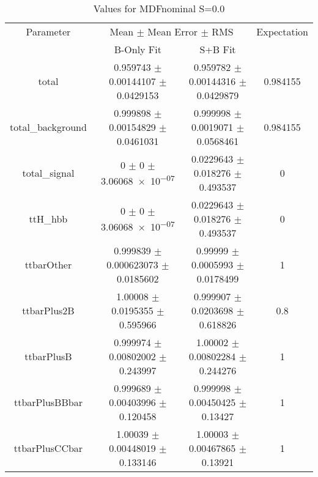 \begin{table}
\centering
\caption{Values for MDFnominal S=0.0}
\begin{tabular}{cccc}
\toprule
Parameter & \multicolumn{2}{c}{Mean $\pm$ Mean Error $\pm$ RMS} & Expectation\\
 & B-Only Fit & S+B Fit & \\
\midrule
total & \num{0.959743} $\pm$ \num{0.00144107} $\pm$ \num{0.0429153} & \num{0.959782} $\pm$ \num{0.00144316} $\pm$ \num{0.0429879} & \num{0.984155}\\
total\_background & \num{0.999898} $\pm$ \num{0.00154829} $\pm$ \num{0.0461031} & \num{0.999998} $\pm$ \num{0.0019071} $\pm$ \num{0.0568461} & \num{0.984155}\\
total\_signal & \num{0} $\pm$ \num{0} $\pm$ \num{3.06068e-07} & \num{0.0229643} $\pm$ \num{0.018276} $\pm$ \num{0.493537} & \num{0}\\
ttH\_hbb & \num{0} $\pm$ \num{0} $\pm$ \num{3.06068e-07} & \num{0.0229643} $\pm$ \num{0.018276} $\pm$ \num{0.493537} & \num{0}\\
ttbarOther & \num{0.999839} $\pm$ \num{0.000623073} $\pm$ \num{0.0185602} & \num{0.99999} $\pm$ \num{0.0005993} $\pm$ \num{0.0178499} & \num{1}\\
ttbarPlus2B & \num{1.00008} $\pm$ \num{0.0195355} $\pm$ \num{0.595966} & \num{0.999907} $\pm$ \num{0.0203698} $\pm$ \num{0.618826} & \num{0.8}\\
ttbarPlusB & \num{0.999974} $\pm$ \num{0.00802002} $\pm$ \num{0.243997} & \num{1.00002} $\pm$ \num{0.00802284} $\pm$ \num{0.244276} & \num{1}\\
ttbarPlusBBbar & \num{0.999689} $\pm$ \num{0.00403996} $\pm$ \num{0.120458} & \num{0.999998} $\pm$ \num{0.00450425} $\pm$ \num{0.13427} & \num{1}\\
ttbarPlusCCbar & \num{1.00039} $\pm$ \num{0.00448019} $\pm$ \num{0.133146} & \num{1.00003} $\pm$ \num{0.00467865} $\pm$ \num{0.13921} & \num{1}\\
\bottomrule
\end{tabular}
\end{table}